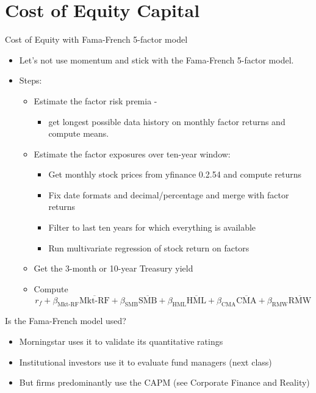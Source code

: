 \documentclass[10pt]{beamer}
\begin{document}
\section{Cost of Equity Capital}
\begin{frame}{Cost of Equity with Fama-French 5-factor model}
    \begin{itemize}
    \item Let's not use momentum and stick with the Fama-French 5-factor model.
    \item Steps:
    \begin{itemize}
    \item Estimate the factor risk premia - 
    \begin{itemize}
    \item get longest possible data history on monthly factor returns and compute means.
    \end{itemize}
    \item Estimate the factor exposures over ten-year window: 
    \begin{itemize}
    \item Get monthly stock prices from yfinance 0.2.54 and compute returns
    \item Fix date formats and decimal/percentage and merge with factor returns
    \item Filter to last ten years for which everything is available
    \item Run multivariate regression of stock return on factors
    \end{itemize}
    \item Get the 3-month or 10-year Treasury yield 
    \item Compute
    $$r_f + \beta_{\text{Mkt-RF}}\overline{\text{Mkt-RF}} + \beta_{\text{SMB}}\overline{\text{SMB}} + \beta_{\text{HML}}\overline{\text{HML}} + \beta_{\text{CMA}}\overline{\text{CMA}} + \beta_{\text{RMW}}\overline{\text{RMW}} $$
        \end{itemize}
    \end{itemize}
\end{frame}

\begin{frame}{Is the Fama-French model used?}
\begin{itemize}
\item Morningstar uses it to validate its quantitative ratings
\item Institutional investors use it to evaluate fund managers (next class)
\item But firms predominantly use the CAPM (see Corporate Finance and Reality)
\end{itemize}
\end{frame}
\end{document}
